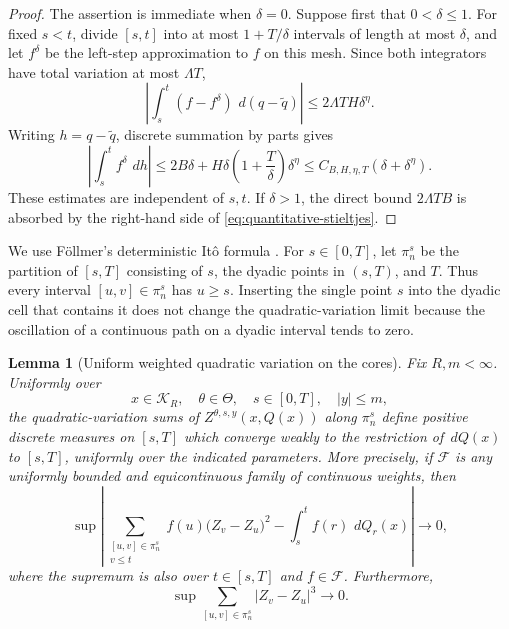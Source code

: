 \documentclass[11pt,reqno]{amsart}
\theoremstyle{plain}
\newtheorem{lemma}[lemma]{Lemma}
\theoremstyle{definition}
\newcommand{\cK}{\mathcal K}
\newcommand{\dd}{\,d}
\newcommand{\abs}[1]{\left\lvert #1\right\rvert}
\begin{document}
\begin{proof}
The assertion is immediate when \(\delta=0\).  Suppose first that
\(0<\delta\le1\).  For fixed \(s<t\), divide \([s,t]\) into at most
\(1+T/\delta\) intervals of length at most \(\delta\), and let \(f^\delta\)
be the left-step approximation to \(f\) on this mesh.  Since both integrators
have total variation at most \(\Lambda T\),
\[
  \left|
    \int_s^t(f-f^\delta)\,\dd(q-\widetilde q)
  \right|
  \le2\Lambda T H\delta^\eta.
\]
Writing \(h=q-\widetilde q\), discrete summation by parts gives
\[
  \left|\int_s^t f^\delta\,\dd h\right|
  \le2B\delta
     +H\delta\left(1+\frac{T}{\delta}\right)\delta^\eta
  \le C_{B,H,\eta,T}(\delta+\delta^\eta).
\]
These estimates are independent of \(s,t\).  If \(\delta>1\), the direct
bound \(2\Lambda TB\) is absorbed by the right-hand side of
\eqref{eq:quantitative-stieltjes}.
\end{proof}

We use F\"ollmer's deterministic It\^o formula
\cite{Follmer81}.  For \(s\in[0,T]\), let \(\pi_n^s\) be the partition of
\([s,T]\) consisting of \(s\), the dyadic points in \((s,T)\), and \(T\).
Thus every interval \([u,v]\in\pi_n^s\) has \(u\ge s\).  Inserting the single
point \(s\) into the dyadic cell that contains it does not change the
quadratic-variation limit because the oscillation of a continuous path on a
dyadic interval tends to zero.

\begin{lemma}[Uniform weighted quadratic variation on the cores]
\label{lem:uniform-weighted-qv}
Fix \(R,m<\infty\).  Uniformly over
\[
  x\in\cK_R,\quad \theta\in\Theta,\quad
  s\in[0,T],\quad \abs{y}\le m,
\]
the quadratic-variation sums of
\(Z^{\theta,s,y}(x,Q(x))\) along \(\pi_n^s\) define positive discrete
measures on \([s,T]\) which converge weakly to the restriction of
\(\dd Q(x)\) to \([s,T]\), uniformly over the indicated parameters.  More
precisely, if \(\mathscr F\) is any uniformly bounded and equicontinuous
family of continuous weights, then
\begin{equation}\label{eq:uniform-weighted-qv}
  \sup
  \left|
    \sum_{\substack{[u,v]\in\pi_n^s\\v\le t}}
      f(u)\bigl(Z_v-Z_u\bigr)^2
    -
    \int_s^t f(r)\,\dd Q_r(x)
  \right|
  \longrightarrow0,
\end{equation}
where the supremum is also over \(t\in[s,T]\) and \(f\in\mathscr F\).
Furthermore,
\begin{equation}\label{eq:uniform-cubic-remainder}
  \sup
  \sum_{[u,v]\in\pi_n^s}
  \abs{Z_v-Z_u}^3
  \longrightarrow0.
\end{equation}
\end{lemma}
\end{document}
